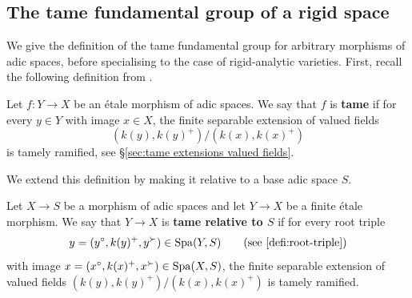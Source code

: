 \subsection{The tame fundamental group of a rigid space}
\label{ss:tame-pi1-rig}

We give the definition of the tame fundamental group for arbitrary morphisms of adic spaces, before specialising to the case of rigid-analytic varieties. First, recall the following definition from \cite{Hubner2021:AdicTameSite}. 

\begin{defi} \label{def:tame-rig-abs}
    Let $f\colon Y\to X$ be an \'etale morphism of adic spaces. We say that $f$ is {\bf tame} if for every $y\in Y$ with image $x\in X$,  the finite separable extension of valued fields 
    \[
        (k(y), k(y)^+)/(k(x), k(x)^+)
    \]
    is tamely ramified, see \S\ref{sec:tame extensions valued fields}.
\end{defi}

We extend this definition by making it relative to a base adic space $S$.

\begin{defi} \label{def:tame-rig}
    Let $X\to S$ be a morphism of adic spaces and let $Y\to X$ be a finite \'etale morphism. We say that $Y\to X$ is \textbf{tame relative to $S$} if for every root triple 
    \[
        y= (y^\circ, k(y)^+, y^\succ) \in \Spa(Y, S)
        \qquad \text{(see~\cref{defi:root-triple})}
    \]
    with image $x = (x^\circ, k(x)^+, x^\succ)\in \operatorname{Spa}(X, S)$, the finite separable extension of valued fields $(k(y), k(y)^+)/(k(x), k(x)^+)$ is tamely ramified. 
\end{defi}

